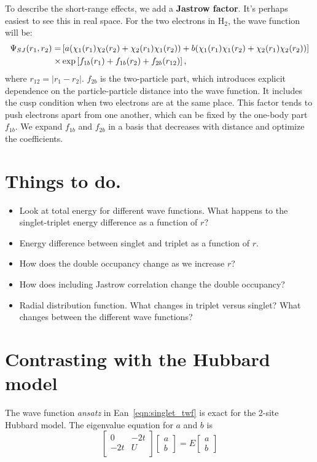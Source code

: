 \documentclass[12pt]{article}
\begin{document}
To describe the short-range effects, we add a {\bf Jastrow factor}.
It's perhaps easiest to see this in real space.
For the two electrons in H$_2$, the wave function will be:
\begin{align}
\Psi_{SJ}(r_1,r_2)=&\left[a(\chi_1(r_1)\chi_2(r_2)+\chi_2(r_1)\chi_1(r_2)) + b(\chi_1(r_1)\chi_1(r_2)+\chi_2(r_1)\chi_2(r_2)) \right] \notag \\
\times& \exp\left[f_{1b}(r_1)+f_{1b}(r_2) + f_{2b}(r_{12})\right],
\label{eqn:slater-jastrow}	
\end{align}
where $r_{12}=|r_1-r_2|$. $f_{2b}$ is the two-particle part, which introduces explicit dependence on the particle-particle distance into the wave function.
It includes the cusp condition when two electrons are at the same place. 
This factor tends to push electrons apart from one another, which can be fixed by the one-body part $f_{1b}$. 
We expand $f_{1b}$ and $f_{2b}$ in a basis that decreases with distance and optimize the coefficients. 


\section*{Things to do.}

\begin{itemize}
\item Look at total energy for different wave functions. What happens to the singlet-triplet energy difference as a function of $r$?
\item Energy difference between singlet and triplet as a function of $r$.
\item How does the double occupancy change as we increase $r$?
\item How does including Jastrow correlation change the double occupancy? 
\item Radial distribution function. What changes in triplet versus singlet? What changes between the different wave functions?
\end{itemize}

\section*{Contrasting with the Hubbard model}

The wave function {\it ansatz} in Ean~\ref{eqn:singlet_twf} is exact for the 2-site Hubbard model. 
The eigenvalue equation for $a$ and $b$ is 
\begin{equation}
	\begin{bmatrix}
	  0 & -2t \\
	  -2t & U \\
    \end{bmatrix} 
\begin{bmatrix}
         a \\
         b
        \end{bmatrix} 
    =
E\begin{bmatrix}
         a \\
         b
        \end{bmatrix} 
\end{equation}
\end{document}
